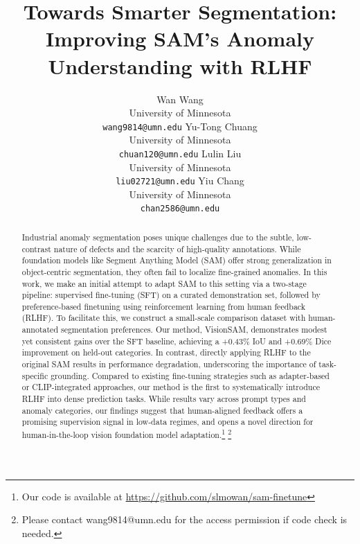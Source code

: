 \documentclass[11pt]{article}
\title{Towards Smarter Segmentation: Improving SAM’s Anomaly Understanding with RLHF}
\author{
  Wan Wang \\
  University of Minnesota \\
  \texttt{wang9814@umn.edu}
  \And
  Yu-Tong Chuang \\
  University of Minnesota \\
  \texttt{chuan120@umn.edu}
  \And
  Lulin Liu \\
  University of Minnesota \\
  \texttt{liu02721@umn.edu}
  \And
  Yiu Chang \\
  University of Minnesota \\
  \texttt{chan2586@umn.edu}
}
\begin{document}
\pagestyle{fancy}
\fancyhead{} %
\fancyfoot{} %
\fancyfoot[R]{\small\thepage}


\maketitle
\begin{abstract}
Industrial anomaly segmentation poses unique challenges due to the subtle, low-contrast nature of defects and the scarcity of high-quality annotations. While foundation models like Segment Anything Model (SAM) offer strong generalization in object-centric segmentation, they often fail to localize fine-grained anomalies. In this work, we make an initial attempt to adapt SAM to this setting via a two-stage pipeline: supervised fine-tuning (SFT) on a curated demonstration set, followed by preference-based finetuning using reinforcement learning from human feedback (RLHF). To facilitate this, we construct a small-scale comparison dataset with human-annotated segmentation preferences. Our method, VisionSAM, demonstrates modest yet consistent gains over the SFT baseline, achieving a +0.43\% IoU and +0.69\% Dice improvement on held-out categories. In contrast, directly applying RLHF to the original SAM results in performance degradation, underscoring the importance of task-specific grounding. Compared to existing fine-tuning strategies such as adapter-based or CLIP-integrated approaches, our method is the first to systematically introduce RLHF into dense prediction tasks. While results vary across prompt types and anomaly categories, our findings suggest that human-aligned feedback offers a promising supervision signal in low-data regimes, and opens a novel direction for human-in-the-loop vision foundation model adaptation.\footnote{Our code is available at \url{https://github.com/slmowan/sam-finetune}} \footnote{Please contact wang9814@umn.edu for the access permission if code check is needed.}
\end{abstract}
\end{document}
